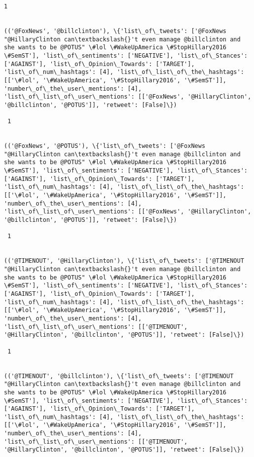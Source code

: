 \documentclass[11pt]{article}
\begin{document}
\begin{Verbatim}[commandchars=\\\{\}]
 1
 

(('@FoxNews', '@billclinton'), \{'list\_of\_tweets': ['@FoxNews  "@HillaryClinton can\textbackslash{}'t even manage @billclinton and she wants to be @POTUS" \#lol \#WakeUpAmerica \#StopHillary2016 \#SemST'], 'list\_of\_sentiments': ['NEGATIVE'], 'list\_of\_Stances': ['AGAINST'], 'list\_of\_Opinion\_Towards': ['TARGET'], 'list\_of\_num\_hashtags': [4], 'list\_of\_list\_of\_the\_hashtags': [['\#lol', '\#WakeUpAmerica', '\#StopHillary2016', '\#SemST']], 'number\_of\_the\_user\_mentions': [4], 'list\_of\_list\_of\_user\_mentions': [['@FoxNews', '@HillaryClinton', '@billclinton', '@POTUS']], 'retweet': [False]\})

 1
 

(('@FoxNews', '@POTUS'), \{'list\_of\_tweets': ['@FoxNews  "@HillaryClinton can\textbackslash{}'t even manage @billclinton and she wants to be @POTUS" \#lol \#WakeUpAmerica \#StopHillary2016 \#SemST'], 'list\_of\_sentiments': ['NEGATIVE'], 'list\_of\_Stances': ['AGAINST'], 'list\_of\_Opinion\_Towards': ['TARGET'], 'list\_of\_num\_hashtags': [4], 'list\_of\_list\_of\_the\_hashtags': [['\#lol', '\#WakeUpAmerica', '\#StopHillary2016', '\#SemST']], 'number\_of\_the\_user\_mentions': [4], 'list\_of\_list\_of\_user\_mentions': [['@FoxNews', '@HillaryClinton', '@billclinton', '@POTUS']], 'retweet': [False]\})

 1
 

(('@TIMENOUT', '@HillaryClinton'), \{'list\_of\_tweets': ['@TIMENOUT  "@HillaryClinton can\textbackslash{}'t even manage @billclinton and she wants to be @POTUS" \#lol \#WakeUpAmerica \#StopHillary2016 \#SemST'], 'list\_of\_sentiments': ['NEGATIVE'], 'list\_of\_Stances': ['AGAINST'], 'list\_of\_Opinion\_Towards': ['TARGET'], 'list\_of\_num\_hashtags': [4], 'list\_of\_list\_of\_the\_hashtags': [['\#lol', '\#WakeUpAmerica', '\#StopHillary2016', '\#SemST']], 'number\_of\_the\_user\_mentions': [4], 'list\_of\_list\_of\_user\_mentions': [['@TIMENOUT', '@HillaryClinton', '@billclinton', '@POTUS']], 'retweet': [False]\})

 1
 

(('@TIMENOUT', '@billclinton'), \{'list\_of\_tweets': ['@TIMENOUT  "@HillaryClinton can\textbackslash{}'t even manage @billclinton and she wants to be @POTUS" \#lol \#WakeUpAmerica \#StopHillary2016 \#SemST'], 'list\_of\_sentiments': ['NEGATIVE'], 'list\_of\_Stances': ['AGAINST'], 'list\_of\_Opinion\_Towards': ['TARGET'], 'list\_of\_num\_hashtags': [4], 'list\_of\_list\_of\_the\_hashtags': [['\#lol', '\#WakeUpAmerica', '\#StopHillary2016', '\#SemST']], 'number\_of\_the\_user\_mentions': [4], 'list\_of\_list\_of\_user\_mentions': [['@TIMENOUT', '@HillaryClinton', '@billclinton', '@POTUS']], 'retweet': [False]\})


\end{Verbatim}
\end{document}
